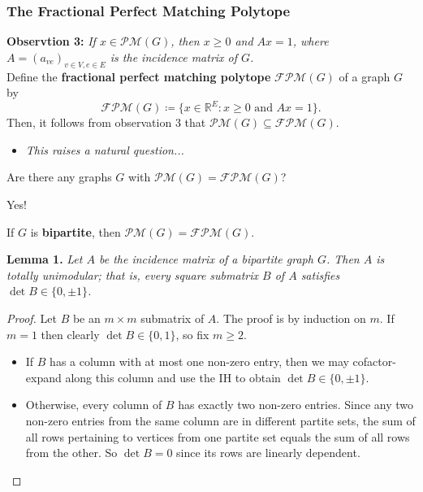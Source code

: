 \begin{frame}
\frametitle{The Fractional Perfect Matching Polytope}
\textbf{Observtion 3:} \emph{If \( x \in \mathcal{P} \mathcal{M} (G) \), then \( x \geq 0 \) and \( Ax = 1 \), where \( A = (a_{ve})_{v \in V, e \in E}  \) is the incidence matrix of \( G \).}\\
\vspace{0.3cm}
Define the \textbf{fractional perfect matching polytope} \( \mathcal{F} \mathcal{P}\mathcal{M} (G)  \) of a graph \( G \) by \[ \mathcal{FPM}(G) \coloneqq \{ x \in \mathbb{R}^{E} : x \geq 0 \mbox{ and } Ax = 1 \}.   \] Then, it follows from observation 3 that \( \mathcal{PM} (G) \subseteq \mathcal{FPM} (G) \).
\begin{itemize}
	\item<2> \emph{This raises a natural question...} 
	
\end{itemize}
\end{frame}

\begin{frame}
\begin{center}
\Large Are there any graphs \( G \) with \( \mathcal{PM} (G) = \mathcal{FPM} (G) \)?
\end{center}
\end{frame}

\begin{frame}
\begin{center}
	\Large Yes!
\end{center}
\end{frame}

\begin{frame}
\begin{center}
	\Large If \( G \) is \textbf{\alert{bipartite}}, then \( \mathcal{PM} (G) = \mathcal{FPM} (G) \).
\end{center}
\end{frame}

\begin{frame}
\textbf{Lemma 1.} \emph{Let \( A \) be the incidence matrix of a bipartite graph \( G \). Then \( A \) is totally unimodular; that is, every square submatrix \( B \) of \( A \) satisfies \( \det B \in \{ 0, \pm 1 \}  \).}
\begin{proof}
Let \( B \) be an \( m \times m \) submatrix of \( A \). The proof is by induction on \( m \). If \( m = 1 \) then clearly \( \det B \in \{ 0,1 \}  \), so fix \( m \geq 2 \).
\begin{itemize}
	\item If \( B \) has a column with at most one non-zero entry, then we may cofactor-expand along this column and use the IH to obtain \( \det B \in \{ 0, \pm 1 \}  \).
	\item Otherwise, every column of \( B \) has exactly two non-zero entries. Since any two non-zero entries from the same column are in different partite sets, the sum of all rows pertaining to vertices from one partite set equals the sum of all rows from the other. So \( \det B = 0 \) since its rows are linearly dependent.
	
\end{itemize}
\end{proof}
\end{frame}

